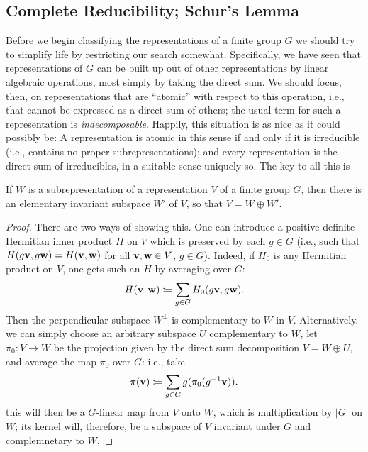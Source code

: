 \subsection{Complete Reducibility; Schur's Lemma}
Before we begin classifying the representations of a finite group $G$ we
should try to simplify life by restricting our search
somewhat. Specifically, we have seen that representations of $G$ can be
built up out of other representations by linear algebraic operations, most
simply by taking the direct sum. We should focus, then, on representations
that are ``atomic'' with respect to this operation, i.e., that cannot be
expressed as a direct sum of others; the usual term for such a
representation is \emph{indecomposable}. Happily, this situation is as nice
as it could possibly be: A representation is atomic in this sense if and
only if it is irreducible (i.e., contains no proper subrepresentations);
and every representation is the direct sum of irreducibles, in a suitable
sense uniquely so. The key to all this is
\begin{proposition}
If $W$ is a subrepresentation of a representation $V$ of a finite group
$G$, then there is an elementary invariant subspace $W'$ of $V$, so that
$V=W\oplus W'$.
\end{proposition}
\begin{proof}
  There are two ways of showing this. One can introduce a positive definite
  Hermitian inner product $H$ on $V$ which is preserved by each $g\in G$
  (i.e., such that $H(g\mathbf{v},g\mathbf{w})=H(\mathbf{v},\mathbf{w})$ for all $\mathbf{v},\mathbf{w}\in V$,
  $g\in G$). Indeed, if $H_0$ is any Hermitian product on $V$, one gets
  such an $H$ by averaging over $G$:
  \begin{equation}
    \label{eq:1:hermitian-inn-prod}
    H(\mathbf{v},\mathbf{w})\coloneqq\sum_{g\in G}H_0(g\mathbf{v},g\mathbf{w}).
  \end{equation}
  Then the perpendicular subspace $W^\perp$ is complementary to $W$ in
  $V$. Alternatively, we can simply choose an arbitrary subspace $U$
  complementary to $W$, let $\pi_0\colon V\to W$ be the projection given by
  the direct sum decomposition $V=W\oplus U$, and average the map $\pi_0$
  over $G$: i.e., take
  \begin{equation}
    \label{eq:1:averaging-map}
    \pi(\mathbf{v})\coloneqq\sum_{g\in G}g(\pi_0(g^{-1}\mathbf{v})).
  \end{equation}
  this will then be a $G$-linear map from $V$ onto $W$, which is
  multiplication by $|G|$ on $W$; its kernel will, therefore, be a subspace
  of $V$ invariant under $G$ and complemnetary to $W$.
\end{proof}

